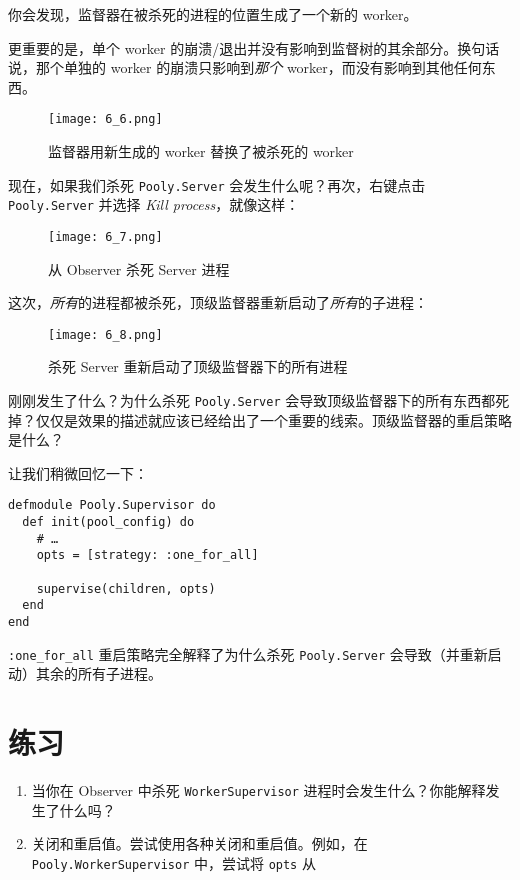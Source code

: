 你会发现，监督器在被杀死的进程的位置生成了一个新的 worker。

更重要的是，单个 worker
的崩溃/退出并没有影响到监督树的其余部分。换句话说，那个单独的 worker
的崩溃只影响到\emph{那个} worker，而没有影响到其他任何东西。

\begin{figure}[!ht]
    \centering
    \texttt{[image: 6\_6.png]}
    \caption{监督器用新生成的 worker 替换了被杀死的 worker}
    \label{fig:6_6}
\end{figure}

现在，如果我们杀死 \texttt{Pooly.Server}
会发生什么呢？再次，右键点击 \texttt{Pooly.Server}
并选择 \emph{Kill process}，就像这样：

\begin{figure}[!ht]
    \centering
    \texttt{[image: 6\_7.png]}
    \caption{从 Observer 杀死 Server 进程}
    \label{fig:6_7}
\end{figure}


这次，\emph{所有}的进程都被杀死，顶级监督器重新启动了\emph{所有}的子进程：

\begin{figure}[!ht]
    \centering
    \texttt{[image: 6\_8.png]}
    \caption{杀死 Server 重新启动了顶级监督器下的所有进程}
    \label{fig:6_8}
\end{figure}


刚刚发生了什么？为什么杀死 \texttt{Pooly.Server}
会导致顶级监督器下的所有东西都死掉？仅仅是效果的描述就应该已经给出了一个重要的线索。顶级监督器的重启策略是什么？

让我们稍微回忆一下：

\begin{code}{}
\begin{verbatim}
defmodule Pooly.Supervisor do
  def init(pool_config) do
    # …
    opts = [strategy: :one_for_all]

    supervise(children, opts)
  end
end
\end{verbatim}
\end{code}

\texttt{:one\_for\_all} 重启策略完全解释了为什么杀死
\texttt{Pooly.Server}
会导致（并重新启动）其余的所有子进程。

 \section{练习}

\begin{enumerate}
\def\labelenumi{\arabic{enumi}.}
\item
  当你在 Observer 中杀死 \texttt{WorkerSupervisor}
  进程时会发生什么？你能解释发生了什么吗？
\item
  关闭和重启值。尝试使用各种关闭和重启值。例如，在
  \texttt{Pooly.WorkerSupervisor} 中，尝试将
  \texttt{opts} 从
\end{enumerate}


